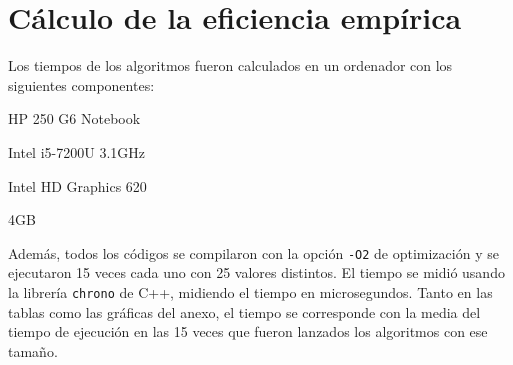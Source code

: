 \documentclass[11pt,twoside,titlepage,a4paper]{article}
\begin{document}
\section{Cálculo de la eficiencia empírica}

Los tiempos de los algoritmos fueron calculados en un ordenador con los siguientes componentes:
\begin{description}[align=left,noitemsep]
\item [\textbf{Modelo:}] HP 250 G6 Notebook 
\item [\textbf{CPU:}] Intel i5-7200U 3.1GHz
\item [\textbf{GPU:}] Intel HD Graphics 620
\item [\textbf{RAM:}] 4GB
\end{description}
Además, todos los códigos se compilaron con la opción \texttt{-O2} de optimización  y se ejecutaron 15 veces
cada uno con 25 valores distintos. El tiempo se midió usando la librería \texttt{chrono} de C++, midiendo el
tiempo en microsegundos. Tanto en las tablas como las gráficas del anexo, el tiempo se corresponde con la media
del tiempo de ejecución en las 15 veces que fueron lanzados los algoritmos con ese tamaño.

\end{document}
